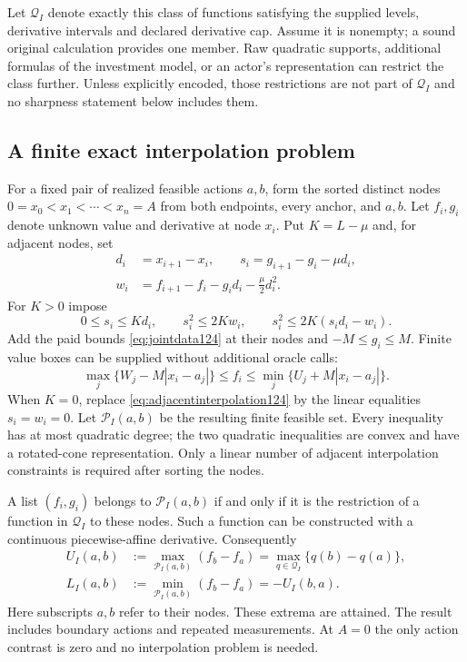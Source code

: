 Let $\mathcal Q_I$ denote exactly this class of functions satisfying the
supplied levels, derivative intervals and declared derivative cap. Assume
it is nonempty; a sound original calculation provides one member. Raw
quadratic supports, additional formulas of the investment model, or an
actor's representation can restrict the class further. Unless explicitly
encoded, those restrictions are not part of $\mathcal Q_I$ and no
sharpness statement below includes them.

\subsection{A finite exact interpolation problem}

For a fixed pair of realized feasible actions $a,b$, form the sorted
distinct nodes $0=x_0<x_1<\cdots<x_n=A$ from both endpoints, every
anchor, and $a,b$. Let $f_i,g_i$ denote unknown value and derivative
at node $x_i$. Put $K=L-\mu$ and, for adjacent nodes, set
\begin{align}
 d_i&=x_{i+1}-x_i,\qquad
 s_i=g_{i+1}-g_i-\mu d_i,\nonumber\\
 w_i&=f_{i+1}-f_i-g_i d_i-\frac\mu2d_i^2.
 \label{eq:interpolationcoordinates124}
\end{align}
For $K>0$ impose
\begin{equation}\label{eq:adjacentinterpolation124}
 0\le s_i\le Kd_i,
 \qquad
 s_i^2\le2K w_i,
 \qquad
 s_i^2\le2K(s_i d_i-w_i).
\end{equation}
Add the paid bounds \eqref{eq:jointdata124} at their nodes and
$-M\le g_i\le M$. Finite value boxes can be supplied without
additional oracle calls:
\begin{equation}\label{eq:valueboxes124}
 \max_j\{W_j-M|x_i-a_j|\}\le f_i\le
 \min_j\{U_j+M|x_i-a_j|\}.
\end{equation}
When $K=0$, replace \eqref{eq:adjacentinterpolation124} by the linear
equalities $s_i=w_i=0$. Let $\mathcal P_I(a,b)$ be the resulting
finite feasible set. Every inequality has at most quadratic degree;
the two quadratic inequalities are convex and have a rotated-cone
representation. Only a linear number of adjacent interpolation
constraints is required after sorting the nodes.

\begin{theorem}
\label{thm:jointinterpolation124}
A list $(f_i,g_i)$ belongs to $\mathcal P_I(a,b)$ if and only if
it is the restriction of a function in $\mathcal Q_I$ to these nodes.
Such a function can be constructed with a continuous piecewise-affine
derivative. Consequently
\begin{align}
 U_I(a,b)&:=\max_{\mathcal P_I(a,b)}(f_b-f_a)
          =\max_{q\in\mathcal Q_I}\{q(b)-q(a)\},\nonumber\\
 L_I(a,b)&:=\min_{\mathcal P_I(a,b)}(f_b-f_a)
          =-U_I(b,a).
 \label{eq:exactcontrast124}
\end{align}
Here subscripts $a,b$ refer to their nodes. These extrema are attained.
The result includes boundary actions and repeated measurements. At
$A=0$ the only action contrast is zero and no interpolation problem is
needed.
\end{theorem}

